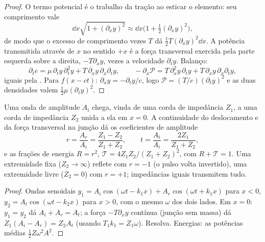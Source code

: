 \begin{proof}
O termo potencial é o trabalho da tração ao esticar o elemento:
seu comprimento vale
\[
\dd x\sqrt{1 + (\partial_xy)^2} \approx \dd x\bigl(1 + \tfrac12(\partial_xy)^2\bigr) ,
\]
de modo que o excesso de comprimento vezes $T$ dá $\tfrac12T(\partial_xy)^2\dd x$. A potência
transmitida através de $x$ no sentido $+x$ é a força transversal exercida
pela parte esquerda sobre a direita, $-T\partial_xy$, vezes a velocidade
$\partial_ty$. Balanço:
\[
\partial_te = \mu\,\partial_ty\,\partial_t^2y + T\,\partial_xy\,\partial_x\partial_ty ,
\qquad
-\partial_x\mathcal P = T\,\partial_x^2y\,\partial_ty + T\,\partial_xy\,\partial_x\partial_ty ,
\]
iguais pela . Para $f(x - ct)$: $\partial_xy = -\partial_ty/c$, logo $\mathcal P = (T/c)
(\partial_ty)^2$ e as duas densidades valem $\tfrac12\mu(\partial_ty)^2$.
\end{proof}

\begin{proposition}\label{prop:b2:waves-on-strings:junction}
Uma onda de amplitude $A_i$ chega, vinda de uma corda de impedância $Z_1$, a
uma corda de impedância $Z_2$ unida a ela em $x = 0$. A continuidade do
deslocamento e da força transversal na junção dá os
coeficientes de amplitude
\[
r = \frac{A_r}{A_i} = \frac{Z_1 - Z_2}{Z_1 + Z_2} , \qquad
t = \frac{A_t}{A_i} = \frac{2Z_1}{Z_1 + Z_2} ,
\]
e as frações de energia $R = r^2$, $\mathcal T = 4Z_1Z_2/(Z_1 + Z_2)^2$, com
$R + \mathcal T = 1$. Uma extremidade fixa ($Z_2 \to \infty$) reflete com $r = -1$
(o pulso volta invertido), uma extremidade livre ($Z_2 = 0$) com $r = +1$;
impedâncias iguais transmitem tudo.
\end{proposition}

\begin{proof}
Ondas senoidais $y_1 = A_i\cos(\omega t - k_1x) + A_r\cos(\omega t + k_1x)$ para
$x < 0$, $y_2 = A_t\cos(\omega t - k_2x)$ para $x > 0$, com o mesmo $\omega$ dos dois
lados. Em $x = 0$: $y_1 = y_2$ dá $A_i + A_r = A_t$; a força $-T\partial_xy$
contínua (junção sem massa) dá $Z_1(A_i - A_r) = Z_2A_t$ (usando
$T_1k_1 = Z_1\omega$). Resolva. Energias: as potências médias $\tfrac12Z\omega^2A^2$.
\end{proof}

